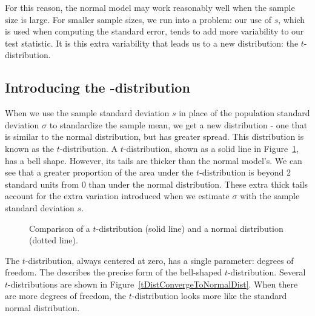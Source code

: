 For this reason, the normal model may work reasonably well when the sample size is large. For smaller sample sizes, we run into a problem: our use of $s$, which is used when computing the standard error, tends to add more variability to our test statistic. It is this extra variability that leads us to a new distribution: the \mbox{$t$-distribution}.


\subsection[Introducing the $t$-distribution]{Introducing the -distribution}
\label{introducingTheTDistribution}


When we use the sample standard deviation $s$ in place of the population standard deviation $\sigma$ to standardize the sample mean, we get a new distribution - one that is similar to the normal distribution, but has greater spread. This distribution is known as the $t$-distribution. A $t$-distribution, shown as a solid line in Figure~\ref{tDistCompareToNormalDist}, has a bell shape. However, its tails are thicker than the normal model's. We can see that a greater proportion of the area under the $t$-distribution is beyond 2 standard units from 0 than under the normal distribution.  These extra thick tails account for the extra variation introduced when we estimate $\sigma$ with the sample standard deviation $s$.  

\begin{figure}[h]
\centering
\caption{Comparison of a $t$-distribution (solid line) and a normal distribution (dotted line).}
\label{tDistCompareToNormalDist}
\end{figure}

The $t$-distribution, always centered at zero, has a single parameter: degrees of freedom. The  describes the precise form of the bell-shaped $t$-distribution. Several $t$-distributions are shown in Figure~\ref{tDistConvergeToNormalDist}. When there are more degrees of freedom, the $t$-distribution looks more like the standard normal distribution.

